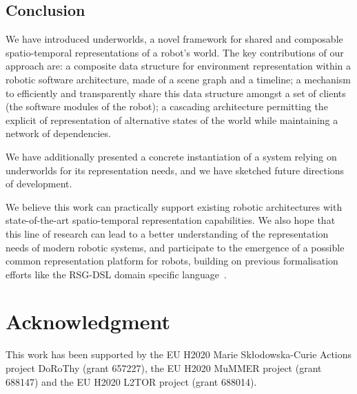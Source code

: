 \documentclass[letterpaper, 10pt, conference]{ieeeconf}
\newcommand{\uwds}{{\sc underworlds}\xspace}
\begin{document}
\subsection{Conclusion}

We have introduced \uwds, a novel framework for shared and composable
spatio-temporal representations of a robot's world. The key contributions of our
approach are: a composite data structure for environment representation within a
robotic software architecture, made of a scene graph and a timeline; a mechanism
to efficiently and transparently share this data structure amongst a set of
clients (the software modules of the robot); a cascading architecture permitting
the explicit of representation of alternative states of the world while
maintaining a network of dependencies.

We have additionally presented a concrete instantiation of a system relying on \uwds
for its representation needs, and we have sketched future directions of
development.

We believe this work can practically support existing robotic architectures with
state-of-the-art spatio-temporal representation capabilities. We also hope that
this line of research can lead to a better understanding of the representation
needs of modern robotic systems, and participate to the emergence of a possible
common representation platform for robots, building on previous formalisation
efforts like the RSG-DSL domain specific language~\cite{blumenthal2014towards}.

\section*{Acknowledgment}

This work has been supported by the EU H2020 Marie Sk\l odowska-Curie Actions
project DoRoThy (grant 657227),  the EU H2020 MuMMER project (grant 688147)
and the EU H2020 L2TOR project (grant 688014).




\end{document}
